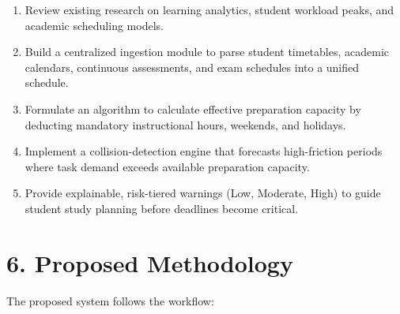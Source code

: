 \documentclass[11pt,a4paper]{article}
\begin{document}
\begin{enumerate}

\item Review existing research on learning analytics, student workload peaks, and academic scheduling models.

\vspace{5mm}

\item Build a centralized ingestion module to parse student timetables, academic calendars, continuous assessments, and exam schedules into a unified schedule.

\vspace{5mm}

\item Formulate an algorithm to calculate effective preparation capacity by deducting mandatory instructional hours, weekends, and holidays.

\vspace{5mm}

\item Implement a collision-detection engine that forecasts high-friction periods where task demand exceeds available preparation capacity.

\vspace{5mm}

\item Provide explainable, risk-tiered warnings (Low, Moderate, High) to guide student study planning before deadlines become critical.

\end{enumerate}



\section*{6. Proposed Methodology}

The proposed system follows the workflow:
\end{document}
